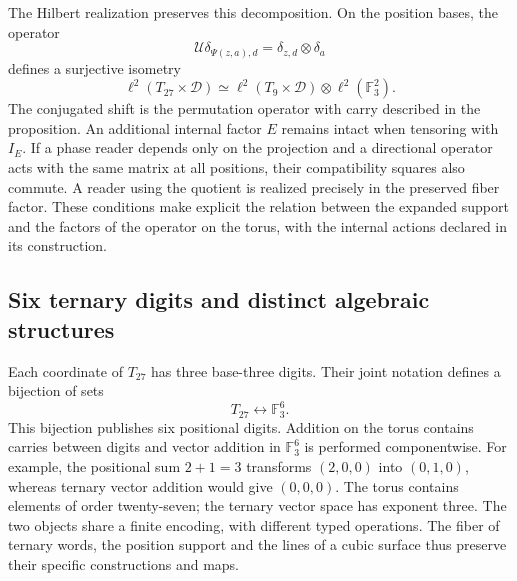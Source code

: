 The Hilbert realization preserves this decomposition. On the position
bases, the operator
\[
 \mathcal U\delta_{\Psi(z,a),d}
       =\delta_{z,d}\otimes\delta_a
\]
defines a surjective isometry
\[
 \ell^2(T_{27}\times\mathcal D)
 \simeq\ell^2(T_9\times\mathcal D)\otimes\ell^2(\mathbb F_3^2).
\]
The conjugated shift is the permutation operator with carry
described in the proposition. An additional internal factor $E$ remains
intact when tensoring with $I_E$. If a phase reader depends only on
the projection and a directional operator acts with the same matrix at
all positions, their compatibility squares also
commute. A reader using the quotient is realized precisely
in the preserved fiber factor. These conditions make explicit the
relation between the expanded support and the factors of the operator on
the torus, with the internal actions declared in its construction.

\subsection{Six ternary digits and distinct algebraic structures}

Each coordinate of $T_{27}$ has three base-three digits. Their joint
notation defines a bijection of sets
\[
 T_{27}\longleftrightarrow\mathbb F_3^6.
\]
This bijection publishes six positional digits. Addition on the torus
contains carries between digits and vector addition in
$\mathbb F_3^6$ is performed componentwise. For example, the
positional sum $2+1=3$ transforms $(2,0,0)$ into $(0,1,0)$, whereas
ternary vector addition would give $(0,0,0)$. The torus contains
elements of order twenty-seven; the ternary vector space has
exponent three. The two objects share a finite encoding,
with different typed operations. The fiber of ternary words,
the position support and the lines of a cubic surface
thus preserve their specific constructions and maps.
